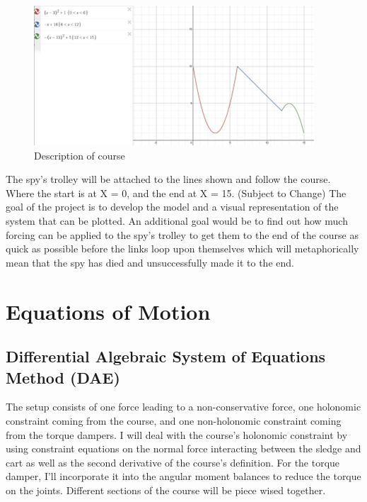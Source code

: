 \documentclass{article}
\begin{document}
\begin{figure}[h]
	\centering
	\includegraphics[scale=0.5]{course_description}	
	\caption{Description of course}
\end{figure}

The spy’s trolley will be attached to the lines shown and follow the course. Where the start is at X = 0, and the end at X = 15. (Subject to Change)
The goal of the project is to develop the model and a visual representation of the system that can be plotted. An additional goal would be to find out how much forcing can be applied to the spy’s trolley to 
get them to the end of the course as quick as possible before the links loop upon themselves which will metaphorically mean that the spy has died and unsuccessfully made it to the end. 

\section{Equations of Motion}
\subsection{Differential Algebraic System of Equations Method (DAE)}
The setup consists of one force leading to a non-conservative force, one holonomic constraint coming from the course, and one non-holonomic constraint coming from the torque dampers. I will deal with the course's holonomic constraint by using constraint equations on the normal force interacting between the sledge and cart as well as the second derivative of the course's definition. For the torque damper, I’ll incorporate it into the angular moment balances to reduce the torque on the joints. Different sections of the course will be piece wised together. \\
\end{document}
